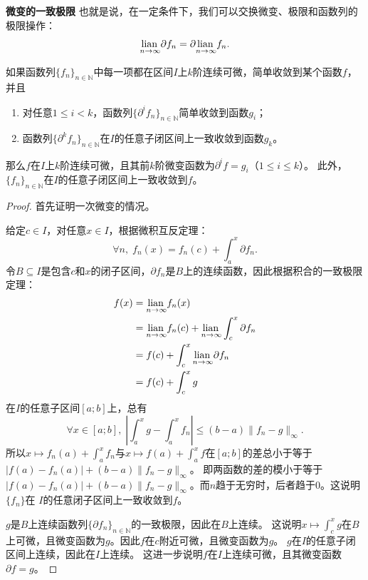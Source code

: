 \documentclass[12pt,UTF8]{ctexbook}
\begin{document}
\begin{appendix}
\begin{tm}{\textbf{微变的一致极限}}
    也就是说，在一定条件下，我们可以交换微变、极限和函数列的极限操作：
    $$ \underset{n\to \infty}{\operatorname{lian}\,} \partial f_n = \partial \underset{n\to \infty}{\operatorname{lian}\,} f_n. $$

    如果函数列$\{f_n\}_{n\in\mathbb{N}}$中每一项都在区间$I$上$k$阶连续可微，简单收敛到某个函数$f$，并且
    \begin{enumerate}
        \item 对任意$1 \leqslant i < k$，函数列$\{\partial^i f_n\}_{n\in\mathbb{N}}$简单收敛到函数$g_i$；
        \item 函数列$\{\partial^k f_n\}_{n\in\mathbb{N}}$在$I$的任意子闭区间上一致收敛到函数$g_k$。
    \end{enumerate}
    那么$f$在$I$上$k$阶连续可微，且其前$k$阶微变函数为$\partial^i f = g_i$（$1 \leqslant i\leqslant k$）。
    此外，$\{f_n\}_{n\in\mathbb{N}}$在$I$的任意子闭区间上一致收敛到$f$。

\end{tm}

\begin{proof}
    首先证明一次微变的情况。
    
    给定$c\in I$，对任意$x\in I$，根据微积互反定理：
    $$ \forall n,\; f_n(x) = f_n(c) + \int_a^x \partial f_n. $$
    令$B\subseteq I$是包含$c$和$x$的闭子区间，$\partial f_n$是$B$上的连续函数，因此根据积合的一致极限定理：
    \begin{align*}
        f(x) &= \underset{n\to\infty}{\operatorname{lian}\,} f_n(x) \\
        &= \underset{n\to\infty}{\operatorname{lian}\,} f_n(c) + \underset{n\to\infty}{\operatorname{lian}\,} \int_c^x \partial f_n \\
        &= f(c) + \int_c^x \underset{n\to\infty}{\operatorname{lian}\,} \partial f_n \\
        &= f(c) + \int_c^x g
    \end{align*}
    在$I$的任意子区间$[a;b]$上，总有
    $$ \forall x \in [a;b], \; \left|\int_a^x g - \int_a^x f_n \right| \leqslant (b - a) \|f_n - g\|_{\infty}.$$
    所以$x\mapsto f_n(a) + \int_a^x f_n$与$x\mapsto f(a) + \int_a^x f$在$[a;b]$的差总小于等于$|f(a) - f_n(a)| + (b - a) \|f_n - g\|_{\infty}$。
    即两函数的差的模小于等于$|f(a) - f_n(a)| + (b - a) \|f_n - g\|_{\infty}$。而$n$趋于无穷时，后者趋于$0$。这说明$\{f_n\}$在
    $I$的任意闭子区间上一致收敛到$f$。

    $g$是$B$上连续函数列$\{\partial f_n\}_{n\in\mathbb{N}}$的一致极限，因此在$B$上连续。
    这说明$x\mapsto \int_c^x g $在$B$上可微，且微变函数为$g$。因此$f$在$c$附近可微，且微变函数为$g$。
    $g$在$I$的任意子闭区间上连续，因此在$I$上连续。
    这进一步说明$f$在$I$上连续可微，且其微变函数$\partial f = g$。
    

\end{proof}
\end{appendix}
\end{document}
